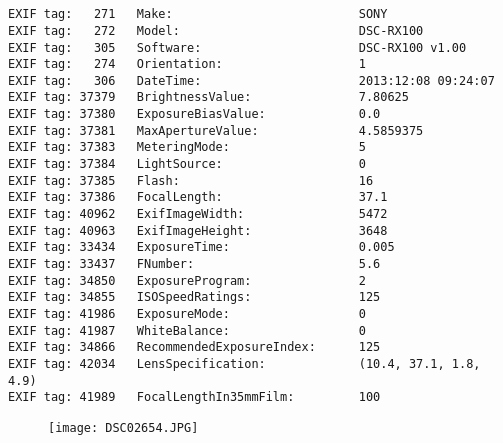 \section{\protect{}}
\noindent 
\noindent
\begin{lstlisting}
EXIF tag:   271   Make:                          SONY
EXIF tag:   272   Model:                         DSC-RX100
EXIF tag:   305   Software:                      DSC-RX100 v1.00
EXIF tag:   274   Orientation:                   1
EXIF tag:   306   DateTime:                      2013:12:08 09:24:07
EXIF tag: 37379   BrightnessValue:               7.80625
EXIF tag: 37380   ExposureBiasValue:             0.0
EXIF tag: 37381   MaxApertureValue:              4.5859375
EXIF tag: 37383   MeteringMode:                  5
EXIF tag: 37384   LightSource:                   0
EXIF tag: 37385   Flash:                         16
EXIF tag: 37386   FocalLength:                   37.1
EXIF tag: 40962   ExifImageWidth:                5472
EXIF tag: 40963   ExifImageHeight:               3648
EXIF tag: 33434   ExposureTime:                  0.005
EXIF tag: 33437   FNumber:                       5.6
EXIF tag: 34850   ExposureProgram:               2
EXIF tag: 34855   ISOSpeedRatings:               125
EXIF tag: 41986   ExposureMode:                  0
EXIF tag: 41987   WhiteBalance:                  0
EXIF tag: 34866   RecommendedExposureIndex:      125
EXIF tag: 42034   LensSpecification:             (10.4, 37.1, 1.8, 4.9)
EXIF tag: 41989   FocalLengthIn35mmFilm:         100

\end{lstlisting}
\clearpage
\begin{figure}
\raggedleft
\texttt{[image: DSC02654.JPG]}
\end{figure}


\clearpage
